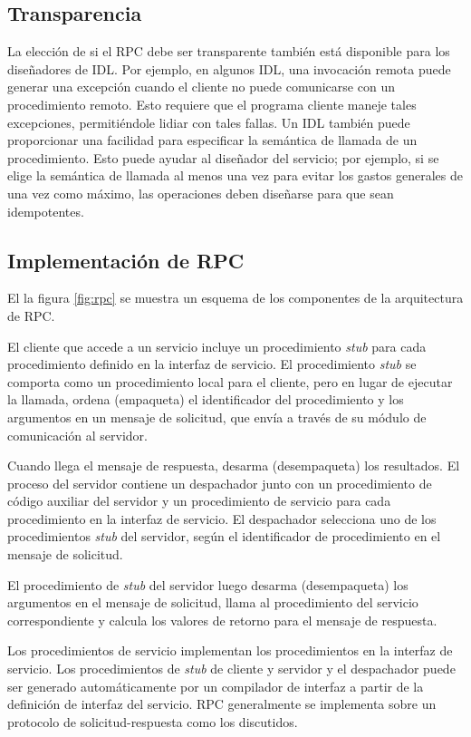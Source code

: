 \subsection*{Transparencia}
La elección de si el RPC debe ser transparente también está disponible para los diseñadores de IDL. Por ejemplo, en algunos IDL, una invocación remota puede generar una excepción cuando el cliente no puede comunicarse con un procedimiento remoto. Esto requiere que el programa cliente maneje tales excepciones, permitiéndole lidiar con tales fallas. Un IDL también puede proporcionar una facilidad para especificar la semántica de llamada de un procedimiento. Esto puede ayudar al diseñador del servicio; por ejemplo, si se elige la semántica de llamada al menos una vez para evitar los gastos generales de una vez como máximo, las operaciones deben diseñarse para que sean idempotentes.


\subsection*{Implementaci\'on de RPC}
El la figura \ref{fig:rpc} se muestra un esquema de los componentes de la arquitectura de RPC. 

El cliente que accede a un servicio incluye un procedimiento \textit{stub} para cada procedimiento definido en la interfaz de servicio. El procedimiento \textit{stub} se comporta como un procedimiento local para el cliente, pero en lugar de ejecutar la llamada, ordena (empaqueta) el identificador del procedimiento y los argumentos en un mensaje de solicitud, que envía a través de su módulo de comunicación al servidor. 


Cuando llega el mensaje de respuesta, desarma (desempaqueta) los resultados. El proceso del servidor contiene un despachador junto con un procedimiento de código auxiliar del servidor y un procedimiento de servicio para cada procedimiento en la interfaz de servicio. El despachador selecciona uno de los procedimientos \textit{stub}  del servidor, según el identificador de procedimiento en el mensaje de solicitud. 

El procedimiento de \textit{stub} del servidor luego  desarma (desempaqueta)  los argumentos en el mensaje de solicitud, llama al procedimiento del servicio correspondiente  y calcula los valores de retorno para el mensaje de respuesta. 

Los procedimientos de servicio implementan los procedimientos en la interfaz de servicio. Los procedimientos de \textit{stub} de cliente y servidor y el despachador puede ser generado automáticamente por un compilador de interfaz a partir de la definición de interfaz del servicio.
RPC generalmente se implementa sobre un protocolo de solicitud-respuesta como los discutidos. 

